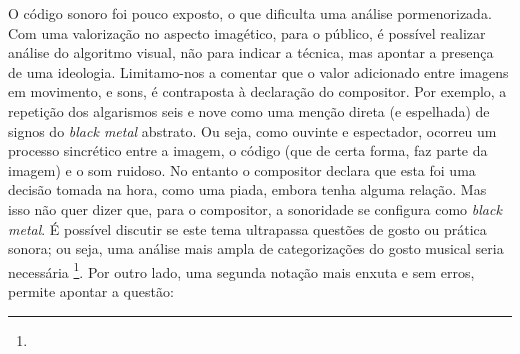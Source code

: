 O código sonoro foi pouco exposto, o que dificulta uma análise pormenorizada. Com uma valorização no aspecto imagético, para o público, é possível realizar análise do algoritmo visual, não para indicar a técnica, mas apontar a presença de uma ideologia. Limitamo-nos a comentar que o valor adicionado entre imagens em movimento, e sons, é contraposta à declaração do compositor. Por exemplo, a repetição dos algarismos seis e nove como uma menção direta (e espelhada) de signos do \emph{black metal} abstrato. Ou seja, como ouvinte e espectador, ocorreu um processo sincrético entre a imagem, o código (que de certa forma, faz parte da imagem) e o som ruidoso. No entanto o compositor declara que esta foi uma decisão tomada na hora, como uma piada, embora tenha alguma relação. Mas isso não quer dizer que, para o compositor, a sonoridade se configura como \emph{black metal}. É possível discutir se este tema ultrapassa questões de gosto ou prática sonora; ou seja, uma análise mais ampla de categorizações do gosto musical seria necessária \footnote{}. Por outro lado, uma segunda notação  mais enxuta e sem erros, permite apontar a questão:


